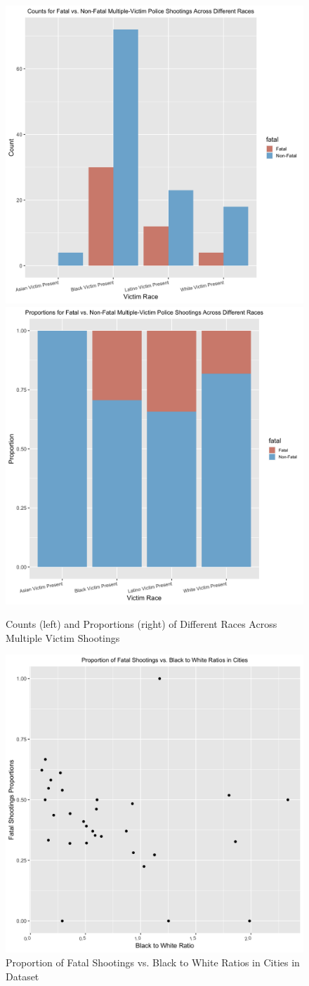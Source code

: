 \documentclass[
]{article}
\begin{document}
\begin{figure}
\includegraphics[width=0.5\linewidth]{figures/multeda1} \includegraphics[width=0.5\linewidth]{figures/multeda2} \caption{Counts (left) and Proportions (right) of Different Races Across Multiple Victim Shootings}\label{fig:figures-mult}
\end{figure}

\begin{figure}
\includegraphics[width=0.5\linewidth]{figures/btweda} \caption{Proportion of Fatal Shootings vs. Black to White Ratios in Cities in Dataset}\label{fig:figures-btw}
\end{figure}
\end{document}
